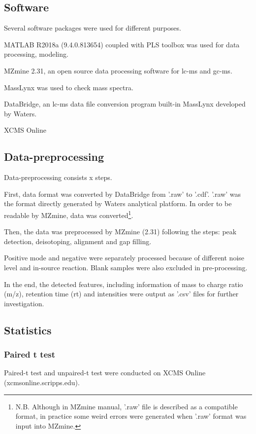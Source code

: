 \subsection{Software}
Several software packages were used for different purposes.

MATLAB R2018a (9.4.0.813654) coupled with PLS toolbox was used for data processing, modeling.

MZmine 2.31, an open source data processing software for \acrshort{lc-ms} and \acrshort{gc-ms}. 

MassLynx was used to check mass spectra.

DataBridge, an \acrshort{lc-ms} data file conversion program built-in MassLynx developed by Waters.

XCMS Online


\subsection{Data-preprocessing}
Data-preprocessing consists x steps.

First, data format was converted by DataBridge from '.raw' to '.cdf'. '.raw' was the format directly generated by Waters analytical platform. In order to be readable by MZmine, data was converted\footnote{N.B. Although in MZmine manual, '.raw' file is described as a compatible format, in practice some weird errors were generated when '.raw' format was input into MZmine.}.

Then, the data was preprocessed by MZmine (2.31) following the steps: peak detection, deisotoping, alignment and gap filling.

Positive mode and negative were separately processed because of different noise level and in-source reaction. Blank samples were also excluded in pre-processing.

In the end, the detected features, including information of mass to charge ratio (m/z), retention time (rt) and intensities were output as '.csv' files for further investigation.


\subsection{Statistics}
\subsubsection{Paired t test}
Paired-t test and unpaired-t test were conducted on XCMS Online (xcmsonline.scripps.edu).
